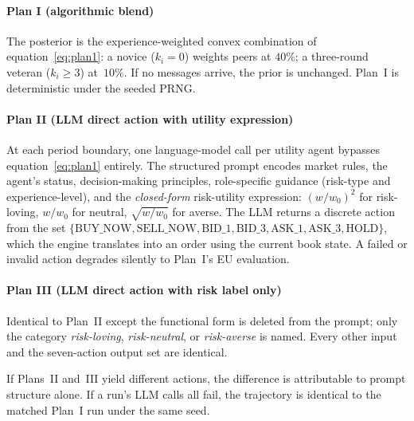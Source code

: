 \paragraph{Plan I (algorithmic blend)}
The posterior is the experience-weighted convex combination of
equation~\eqref{eq:plan1}: a novice ($k_i{=}0$) weights peers at
$40\%$; a three-round veteran ($k_i{\ge}3$) at~$10\%$.  If no
messages arrive, the prior is unchanged.  Plan~I is deterministic
under the seeded PRNG.

\paragraph{Plan II (LLM direct action with utility expression)}
At each period boundary, one language-model call per utility agent
bypasses equation~\eqref{eq:plan1} entirely.  The structured prompt
encodes market rules, the agent's status, decision-making principles,
role-specific guidance (risk-type and experience-level), and the
\emph{closed-form} risk-utility expression:
$(w/w_0)^2$ for risk-loving, $w/w_0$ for neutral, $\sqrt{w/w_0}$ for
averse.  The LLM returns a discrete action from the set
$\{\text{BUY\_NOW}, \text{SELL\_NOW}, \text{BID\_1}, \text{BID\_3},
\text{ASK\_1}, \text{ASK\_3}, \text{HOLD}\}$,
which the engine translates into an order using the current book state.
A failed or invalid action degrades silently to Plan~I's EU evaluation.

\paragraph{Plan III (LLM direct action with risk label only)}
Identical to Plan~II except the functional form is deleted from the
prompt; only the category \emph{risk-loving}, \emph{risk-neutral}, or
\emph{risk-averse} is named.  Every other input and the seven-action
output set are identical.

If Plans~II and~III yield different actions, the difference is
attributable to prompt structure alone.  If a run's LLM calls all
fail, the trajectory is identical to the matched Plan~I run under the
same seed.
